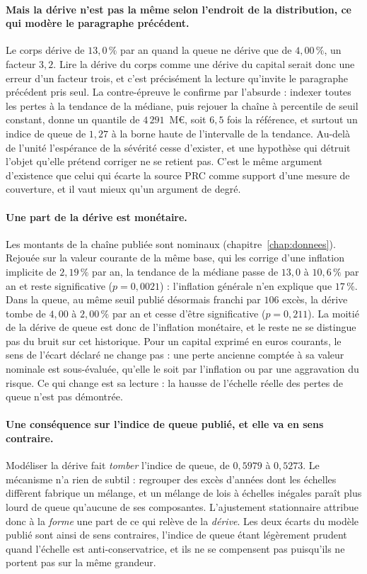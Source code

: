 \paragraph{Mais la dérive n'est pas la même selon l'endroit de la distribution, ce qui modère le
paragraphe précédent.} Le corps dérive de $13{,}0\,\%$ par an quand la queue ne dérive que de
$4{,}00\,\%$, un facteur $3{,}2$. Lire la dérive du corps comme une dérive du capital serait donc
une erreur d'un facteur trois, et c'est précisément la lecture qu'invite le paragraphe précédent
pris seul. La contre-épreuve le confirme par l'absurde : indexer toutes les pertes à la tendance
de la médiane, puis rejouer la chaîne à percentile de seuil constant, donne un quantile de
$4\,291$~M\euro, soit $6{,}5$ fois la référence, et surtout un indice de queue de $1{,}27$ à la
borne haute de l'intervalle de la tendance. Au-delà de l'unité l'espérance de la sévérité cesse
d'exister, et une hypothèse qui détruit l'objet qu'elle prétend corriger ne se retient pas.
C'est le même argument d'existence que celui qui écarte la source PRC comme support d'une mesure
de couverture, et il vaut mieux qu'un argument de degré.

\paragraph{Une part de la dérive est monétaire.} Les montants de la chaîne publiée sont
nominaux (chapitre~\ref{chap:donnees}). Rejouée sur la valeur courante de la même base, qui les
corrige d'une inflation implicite de $2{,}19\,\%$ par an, la tendance de la médiane passe de
$13{,}0$ à $10{,}6\,\%$ par an et reste significative ($p=0{,}0021$) : l'inflation générale n'en
explique que $17\,\%$. Dans la queue, au même seuil publié désormais franchi par $106$ excès, la
dérive tombe de $4{,}00$ à $2{,}00\,\%$ par an et cesse d'être significative ($p=0{,}211$). La
moitié de la dérive de queue est donc de l'inflation monétaire, et le reste ne se distingue pas
du bruit sur cet historique. Pour un capital exprimé en euros courants, le sens de l'écart
déclaré ne change pas : une perte ancienne comptée à sa valeur nominale est sous-évaluée,
qu'elle le soit par l'inflation ou par une aggravation du risque. Ce qui change est sa lecture :
la hausse de l'échelle réelle des pertes de queue n'est pas démontrée.

\paragraph{Une conséquence sur l'indice de queue publié, et elle va en sens contraire.}
Modéliser la dérive fait \emph{tomber} l'indice de queue, de $0{,}5979$ à $0{,}5273$. Le
mécanisme n'a rien de subtil : regrouper des excès d'années dont les échelles diffèrent fabrique
un mélange, et un mélange de lois à échelles inégales paraît plus lourd de queue qu'aucune de ses
composantes. L'ajustement stationnaire attribue donc à la \emph{forme} une part de ce qui relève
de la \emph{dérive}. Les deux écarts du modèle publié sont ainsi de sens contraires, l'indice de
queue étant légèrement prudent quand l'échelle est anti-conservatrice, et ils ne se compensent
pas puisqu'ils ne portent pas sur la même grandeur.


